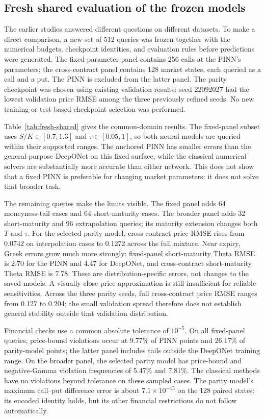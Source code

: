 \documentclass[11pt,a4paper]{article}
\begin{document}
\clearpage
\subsection{Fresh shared evaluation of the frozen models}
\label{sec:fresh-shared}
The earlier studies answered different questions on different datasets. To make a direct comparison, a new set of 512 queries was frozen together with the numerical budgets, checkpoint identities, and evaluation rules before predictions were generated. The fixed-parameter panel contains 256 calls at the PINN's parameters; the cross-contract panel contains 128 market states, each queried as a call and a put. The PINN is excluded from the latter panel. The parity checkpoint was chosen using existing validation results: seed 22092027 had the lowest validation price RMSE among the three previously refined seeds. No new training or test-based checkpoint selection was performed.

Table~\ref{tab:fresh-shared} gives the common-domain results. The fixed-panel subset uses $S/K\in[0.7,1.3]$ and $\tau\in[0.05,1]$, so both neural models are queried within their supported ranges. The anchored PINN has smaller errors than the general-purpose DeepONet on this fixed surface, while the classical numerical solvers are substantially more accurate than either network. This does not show that a fixed PINN is preferable for changing market parameters: it does not solve that broader task.


The remaining queries make the limits visible. The fixed panel adds 64 moneyness-tail cases and 64 short-maturity cases. The broader panel adds 32 short-maturity and 96 extrapolation queries; its maturity extension changes both $T$ and $\tau$. For the selected parity model, cross-contract price RMSE rises from 0.0742 on interpolation cases to 0.1272 across the full mixture. Near expiry, Greek errors grow much more strongly: fixed-panel short-maturity Theta RMSE is 2.70 for the PINN and 4.47 for DeepONet, and cross-contract short-maturity Theta RMSE is 7.78. These are distribution-specific errors, not changes to the saved models. A visually close price approximation is still insufficient for reliable sensitivities. Across the three parity seeds, full cross-contract price RMSE ranges from 0.127 to 0.204; the small validation spread therefore does not establish general stability outside that validation distribution.

Financial checks use a common absolute tolerance of $10^{-5}$. On all fixed-panel queries, price-bound violations occur at 9.77\% of PINN points and 26.17\% of parity-model points; the latter panel includes tails outside the DeepONet training range. On the broader panel, the selected parity model has price-bound and negative-Gamma violation frequencies of 5.47\% and 7.81\%. The classical methods have no violations beyond tolerance on these sampled cases. The parity model's maximum call--put difference error is about $7.1\times10^{-15}$ on the 128 paired states: its encoded identity holds, but its other financial restrictions do not follow automatically.
\end{document}
